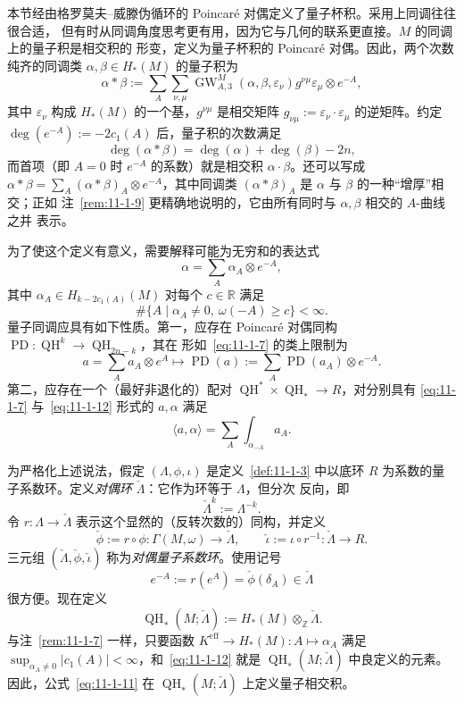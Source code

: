 \begin{remark}\label{rem:11-1-20}
本节经由格罗莫夫--威滕伪循环的 Poincaré 对偶定义了量子杯积。采用上同调往往很合适，
但有时从同调角度思考更有用，因为它与几何的联系更直接。$M$ 的同调上的量子积是相交积的
形变，定义为量子杯积的 Poincaré 对偶。因此，两个次数纯齐的同调类
$\alpha,\beta\in H_*(M)$ 的量子积为
\begin{equation}\label{eq:11-1-11}
  \alpha*\beta:=
  \sum_A\sum_{\nu,\mu}
  \operatorname{GW}_{A,3}^M(\alpha,\beta,\varepsilon_\nu)
  g^{\nu\mu}\varepsilon_\mu\otimes e^{-A},
\end{equation}
其中 $\varepsilon_\nu$ 构成 $H_*(M)$ 的一个基，$g^{\nu\mu}$ 是相交矩阵
$g_{\nu\mu}:=\varepsilon_\nu\cdot\varepsilon_\mu$ 的逆矩阵。约定
$\deg(e^{-A}):=-2c_1(A)$ 后，量子积的次数满足
\[
  \deg(\alpha*\beta)=\deg(\alpha)+\deg(\beta)-2n,
\]
而首项（即 $A=0$ 时 $e^{-A}$ 的系数）就是相交积 $\alpha\cdot\beta$。还可以写成
$\alpha*\beta=\sum_A(\alpha*\beta)_A\otimes e^{-A}$，其中同调类
$(\alpha*\beta)_A$ 是 $\alpha$ 与 $\beta$ 的一种“增厚”相交；正如
注~\ref{rem:11-1-9} 更精确地说明的，它由所有同时与 $\alpha,\beta$ 相交的 $A$-曲线之并
表示。

为了使这个定义有意义，需要解释可能为无穷和的表达式
\begin{equation}\label{eq:11-1-12}
  \alpha=\sum_A\alpha_A\otimes e^{-A},
\end{equation}
其中 $\alpha_A\in H_{k-2c_1(A)}(M)$ 对每个 $c\in\mathbb R$ 满足
\[
  \#\{A\mid\alpha_A\ne0,\ \omega(-A)\ge c\}<\infty.
\]
量子同调应具有如下性质。第一，应存在 Poincaré 对偶同构
$\operatorname{PD}:\operatorname{QH}^k\to\operatorname{QH}_{2n-k}$，其在
形如~\eqref{eq:11-1-7} 的类上限制为
\[
  a=\sum_Aa_A\otimes e^A
  \longmapsto
  \operatorname{PD}(a):=\sum_A\operatorname{PD}(a_A)\otimes e^{-A}.
\]
第二，应存在一个（最好非退化的）配对
$\operatorname{QH}^*\times\operatorname{QH}_*\to R$，对分别具有
\eqref{eq:11-1-7} 与~\eqref{eq:11-1-12} 形式的 $a,\alpha$ 满足
\[
  \langle a,\alpha\rangle=\sum_A\int_{\alpha_{-A}}a_A.
\]

为严格化上述说法，假定 $(\Lambda,\phi,\iota)$ 是定义~\ref{def:11-1-3} 中以底环 $R$
为系数的量子系数环。定义\emph{对偶环} $\check\Lambda$：它作为环等于 $\Lambda$，但分次
反向，即
\[
  \check\Lambda^k:=\Lambda^{-k}.
\]
令 $r:\Lambda\to\check\Lambda$ 表示这个显然的（反转次数的）同构，并定义
\[
  \check\phi:=r\circ\phi:\Gamma(M,\omega)\to\check\Lambda,\qquad
  \check\iota:=\iota\circ r^{-1}:\check\Lambda\to R.
\]
三元组 $(\check\Lambda,\check\phi,\check\iota)$ 称为\emph{对偶量子系数环}。使用记号
\[
  e^{-A}:=r(e^A)=\check\phi(\delta_A)\in\check\Lambda
\]
很方便。现在定义
\[
  \operatorname{QH}_*(M;\check\Lambda)
  :=H_*(M)\otimes_{\mathbb Z}\check\Lambda.
\]
与注~\ref{rem:11-1-7} 一样，只要函数
$K^{\mathrm{eff}}\to H_*(M):A\mapsto\alpha_A$ 满足
$\sup_{\alpha_A\ne0}|c_1(A)|<\infty$，和~\eqref{eq:11-1-12} 就是
$\operatorname{QH}_*(M;\check\Lambda)$ 中良定义的元素。因此，公式~\eqref{eq:11-1-11}
在 $\operatorname{QH}_*(M;\check\Lambda)$ 上定义量子相交积。


\end{remark}
